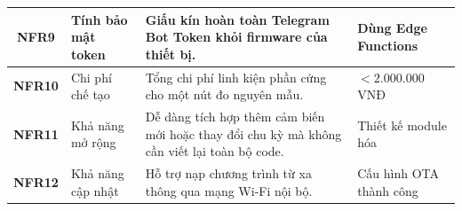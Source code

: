 \begin{table}[H]
\begin{tabularx}{\textwidth}{|c|p{3.0cm}|X|p{2.6cm}|}
\textbf{NFR9} & Tính bảo mật token & 
Giấu kín hoàn toàn Telegram Bot Token khỏi firmware của thiết bị. 
& Dùng Edge Functions \\
\hline

\textbf{NFR10} & Chi phí chế tạo & 
Tổng chi phí linh kiện phần cứng cho một nút đo nguyên mẫu. 
& $< 2.000.000$ VNĐ \\
\hline

\textbf{NFR11} & Khả năng mở rộng & 
Dễ dàng tích hợp thêm cảm biến mới hoặc thay đổi chu kỳ mà không cần viết lại toàn bộ code. 
& Thiết kế module hóa \\
\hline

\textbf{NFR12} & Khả năng cập nhật & 
Hỗ trợ nạp chương trình từ xa thông qua mạng Wi-Fi nội bộ. 
& Cấu hình OTA thành công \\
\hline

\end{tabularx}
\end{table}